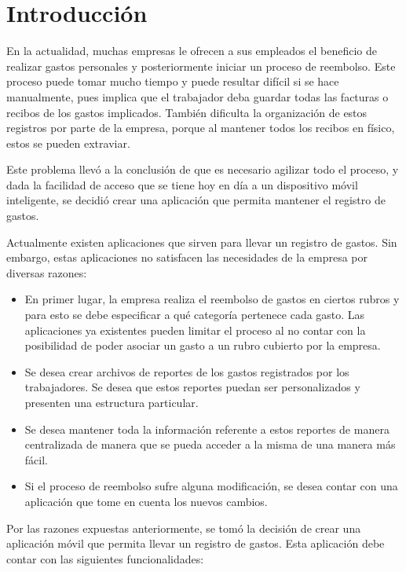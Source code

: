 \chapter*{Introducción} \label{sec:Introduccion}

\vspace{5 mm}
En la actualidad, muchas empresas le ofrecen a sus empleados el beneficio de realizar gastos personales y posteriormente iniciar un proceso de reembolso. Este proceso puede tomar mucho tiempo y puede resultar difícil si se hace manualmente, pues implica que el trabajador deba guardar todas las facturas o recibos de los gastos implicados. También dificulta la organización de estos registros por parte de la empresa, porque al mantener todos los recibos en físico, estos se pueden extraviar.

Este problema llevó a la conclusión de que es necesario agilizar todo el proceso, y dada la facilidad de acceso que se tiene hoy en día a un dispositivo móvil inteligente, se decidió crear una aplicación que permita mantener el registro de gastos. 

Actualmente existen aplicaciones que sirven para llevar un registro de gastos. Sin embargo, estas aplicaciones no satisfacen las necesidades de la empresa por diversas razones:

\begin{itemize}
\item En primer lugar, la empresa realiza el reembolso de gastos en ciertos rubros y para esto se debe especificar a qué categoría pertenece cada gasto. Las aplicaciones ya existentes pueden limitar el proceso al no contar con la posibilidad de poder asociar un gasto a un rubro cubierto por la empresa.
\item Se desea crear archivos de reportes de los gastos registrados por los trabajadores. Se desea que estos reportes puedan ser personalizados y presenten una estructura particular.
\item Se desea mantener toda la información referente a estos reportes de manera centralizada de manera que se pueda acceder a la misma de una manera más fácil.
\item Si el proceso de reembolso sufre alguna modificación, se desea contar con una aplicación que tome en cuenta los nuevos cambios.
\end{itemize}

Por las razones expuestas anteriormente, se tomó la decisión de crear una aplicación móvil que permita llevar un registro de gastos. Esta aplicación debe contar con las siguientes funcionalidades:

